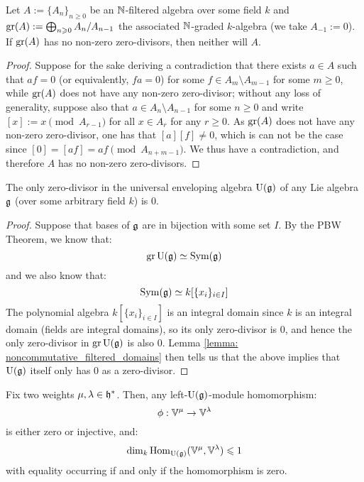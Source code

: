         \begin{lemma} \label{lemma: noncommutative_filtered_domains}
            \cite[Exercise I.9.4, pp. 20]{kassel_quantum_groups} Let $A := \{A_n\}_{n \geq 0}$ be an $\mathbb{N}$-filtered algebra over some field $k$ and $\operatorname{gr}(A) := \bigoplus_{n \geqslant 0} A_n/A_{n - 1}$ the associated $\mathbb{N}$-graded $k$-algebra (we take $A_{-1} := 0$). If $\operatorname{gr}(A)$ has no non-zero zero-divisors, then neither will $A$. 
        \end{lemma}
            \begin{proof}
                Suppose for the sake deriving a contradiction that there exists $a \in A$ such that $af = 0$ (or equivalently, $fa = 0$) for some $f \in A_m \setminus A_{m - 1}$ for some $m \geq 0$, while $\operatorname{gr}(A)$ does not have any non-zero zero-divisor; without any loss of generality, suppose also that $a \in A_n \setminus A_{n - 1}$ for some $n \geq 0$ and write $[x] := x \pmod{A_{r - 1}}$ for all $x \in A_r$ for any $r \geq 0$. As $\operatorname{gr}(A)$ does not have any non-zero zero-divisor, one has that $[a] [f]\not = 0$, which is can not be the case since $[0] = [af] = af \pmod{A_{n + m - 1}}$. We thus have a contradiction, and therefore $A$ has no non-zero zero-divisors. 
            \end{proof}
        \begin{corollary} \label{coro: universal_enveloping_algebras_are_noncommutative_domains}
            The only zero-divisor in the universal enveloping algebra $\mathrm{U}(\mathfrak{g})$ of any Lie algebra $\mathfrak{g}$ (over some arbitrary field $k$) is $0$.
        \end{corollary}
            \begin{proof}
                Suppose that bases of $\mathfrak{g}$ are in bijection with some set $I$. By the PBW Theorem, we know that:
                    $$\operatorname{gr} \mathrm{U}(\mathfrak{g}) \simeq \mathrm{Sym}(\mathfrak{g})$$
                and we also know that:
                    $$\mathrm{Sym}(\mathfrak{g}) \simeq k[\{x_i\}_{i \in I}]$$
                The polynomial algebra $k[\{x_i\}_{i \in I}]$ is an integral domain since $k$ is an integral domain (fields are integral domains), so its only zero-divisor is $0$, and hence the only zero-divisor in $\operatorname{gr} \mathrm{U}(\mathfrak{g})$ is also $0$. Lemma \ref{lemma: noncommutative_filtered_domains} then tells us that the above implies that $\mathrm{U}(\mathfrak{g})$ itself only has $0$ as a zero-divisor.
            \end{proof}
        \begin{proposition} \label{prop: homomorphisms_between_verma_modules_are_zero_or_injective}
            Fix two weights $\mu, \lambda \in \mathfrak{h}^*$. Then, any left-$\mathrm{U}(\mathfrak{g})$-module homomorphism:
                $$\phi: \mathbb{V}^{\mu} \to \mathbb{V}^{\lambda}$$
            is either zero or injective, and:
                $$\dim_k \mathrm{Hom}_{\mathrm{U}(\mathfrak{g})}(\mathbb{V}^{\mu}, \mathbb{V}^{\lambda}) \leqslant 1$$
            with equality occurring if and only if the homomorphism is zero. 
        \end{proposition}
